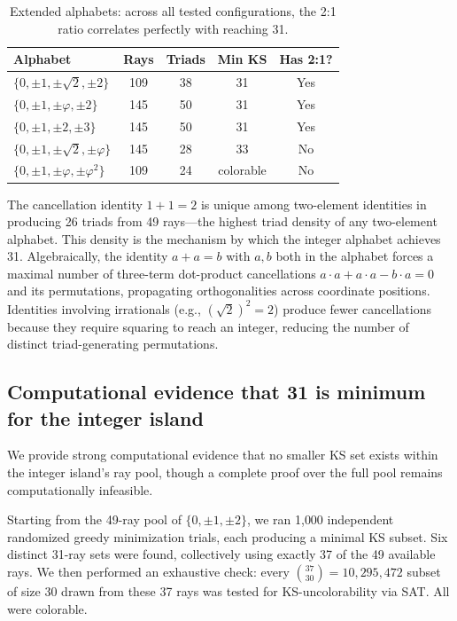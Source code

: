 \documentclass[12pt,a4paper]{article}
\begin{document}
\begin{table}[ht]
\centering
\caption{Extended alphabets: across all tested configurations, the 2:1 ratio correlates perfectly with reaching 31.}
\label{tab:extended}
\begin{tabular}{lcccc}
\toprule
Alphabet & Rays & Triads & Min KS & Has 2:1? \\
\midrule
$\{0,\pm 1,\pm\sqrt{2},\pm 2\}$ & 109 & 38 & 31 & Yes \\
$\{0,\pm 1,\pm\varphi,\pm 2\}$ & 145 & 50 & 31 & Yes \\
$\{0,\pm 1,\pm 2,\pm 3\}$ & 145 & 50 & 31 & Yes \\
$\{0,\pm 1,\pm\sqrt{2},\pm\varphi\}$ & 145 & 28 & 33 & No \\
$\{0,\pm 1,\pm\varphi,\pm\varphi^2\}$ & 109 & 24 & colorable & No \\
\bottomrule
\end{tabular}
\end{table}

The cancellation identity $1 + 1 = 2$ is unique among two-element identities in producing 26 triads from 49 rays---the highest triad density of any two-element alphabet. This density is the mechanism by which the integer alphabet achieves 31. Algebraically, the identity $a + a = b$ with $a, b$ both in the alphabet forces a maximal number of three-term dot-product cancellations $a \cdot a + a \cdot a - b \cdot a = 0$ and its permutations, propagating orthogonalities across coordinate positions. Identities involving irrationals (e.g., $(\sqrt{2})^2 = 2$) produce fewer cancellations because they require squaring to reach an integer, reducing the number of distinct triad-generating permutations.

\subsection{Computational evidence that 31 is minimum for the integer island}\label{sec:exhaustive}

We provide strong computational evidence that no smaller KS set exists within the integer island's ray pool, though a complete proof over the full pool remains computationally infeasible.

Starting from the 49-ray pool of $\{0, \pm 1, \pm 2\}$, we ran 1{,}000 independent randomized greedy minimization trials, each producing a minimal KS subset. Six distinct 31-ray sets were found, collectively using exactly 37 of the 49 available rays. We then performed an exhaustive check: every $\binom{37}{30} = 10{,}295{,}472$ subset of size 30 drawn from these 37 rays was tested for KS-uncolorability via SAT. All were colorable.
\end{document}
